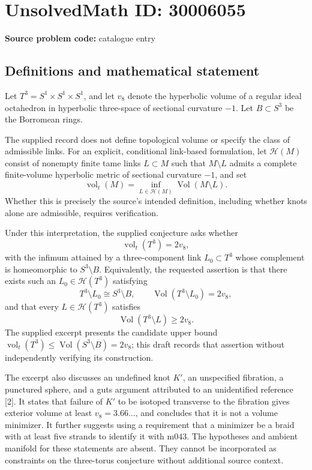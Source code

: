 \documentclass[11pt]{article}
\begin{document}
\section*{UnsolvedMath ID: 30006055}
\textbf{Source problem code:} catalogue entry
\subsection{Definitions and mathematical statement}
Let \(T^3=S^1\times S^1\times S^1\), and let \(v_8\) denote the hyperbolic volume of a regular ideal octahedron in hyperbolic three-space of sectional curvature \(-1\). Let \(B\subset S^3\) be the Borromean rings.

The supplied record does not define topological volume or specify the class of admissible links. For an explicit, conditional link-based formulation, let \(\mathcal H(M)\) consist of nonempty finite tame links \(L\subset M\) such that \(M\setminus L\) admits a complete finite-volume hyperbolic metric of sectional curvature \(-1\), and set
\[
\operatorname{vol}_t(M)=\inf_{L\in\mathcal H(M)}\operatorname{Vol}(M\setminus L).
\]
Whether this is precisely the source's intended definition, including whether knots alone are admissible, requires verification.

Under this interpretation, the supplied conjecture asks whether
\[
\operatorname{vol}_t(T^3)=2v_8,
\]
with the infimum attained by a three-component link \(L_0\subset T^3\) whose complement is homeomorphic to \(S^3\setminus B\). Equivalently, the requested assertion is that there exists such an \(L_0\in\mathcal H(T^3)\) satisfying
\[
T^3\setminus L_0\cong S^3\setminus B,
\qquad
\operatorname{Vol}(T^3\setminus L_0)=2v_8,
\]
and that every \(L\in\mathcal H(T^3)\) satisfies
\[
\operatorname{Vol}(T^3\setminus L)\geq 2v_8.
\]
The supplied excerpt presents the candidate upper bound
\(\operatorname{vol}_t(T^3)\leq\operatorname{Vol}(S^3\setminus B)=2v_8\); this draft records that assertion without independently verifying its construction.

The excerpt also discusses an undefined knot \(K'\), an unspecified fibration, a punctured sphere, and a guts argument attributed to an unidentified reference [2]. It states that failure of \(K'\) to be isotoped transverse to the fibration gives exterior volume at least \(v_8=3.66\ldots\), and concludes that it is not a volume minimizer. It further suggests using a requirement that a minimizer be a braid with at least five strands to identify it with \(\mathrm{m043}\). The hypotheses and ambient manifold for these statements are absent. They cannot be incorporated as constraints on the three-torus conjecture without additional source context.
\end{document}
